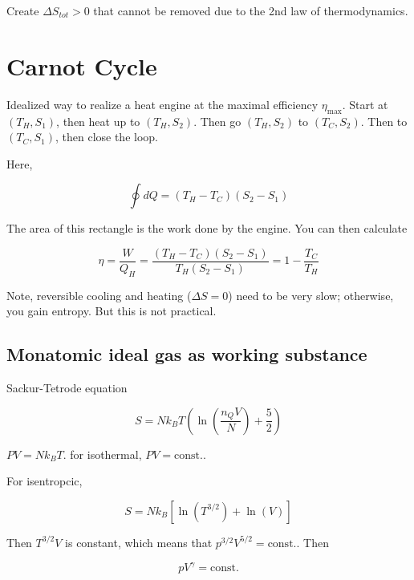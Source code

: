 \documentclass{article}
\newtheorem{one minute paper}[theorem]{One Minute Paper}
\begin{document}
Create $\Delta S_{tot}>0$ that cannot be removed due to the 2nd law of thermodynamics. 

\section*{Carnot Cycle}

Idealized way to realize a heat engine at the maximal efficiency $\eta_{\max}$. Start at $(T_H, S_1)$, then heat up to $(T_H, S_2)$. Then go $(T_H, S_2)$ to $(T_C, S_2)$. Then to $(T_C, S_1)$, then close the loop. 

Here, 

\begin{equation}
    \oint dQ = (T_H - T_C)(S_2 - S_1)
\end{equation}

The area of this rectangle is the work done by the engine. You can then calculate 

\begin{equation}
    \eta = \frac{W}{Q_H} = \frac{(T_H - T_C)(S_2 - S_1)}{T_H(S_2 - S_1)} = 1 - \frac{T_C}{T_H} 
\end{equation}

Note, reversible cooling and heating ($\Delta S =0$) need to be very slow; otherwise, you gain entropy. But this is not practical. 

\subsection*{Monatomic ideal gas as working substance}

Sackur-Tetrode equation 

\begin{equation}
    S = Nk_B T\left( \ln\left( \frac{n_Q V}{N} \right) + \frac{5}{2} \right)
\end{equation}

$PV = Nk_B T$. for isothermal, $PV = \text{const.}$. 

For isentropcic, 

\begin{equation}
    S = Nk_B \left[ \ln(T^{3/2}) + \ln(V) \right]
\end{equation}

Then $T^{3/2}V$ is constant, which means that $p^{3/2}V^{5/2} = \text{const.}$. Then 

\begin{equation}
    pV^{\gamma} = \text{const.}
\end{equation}
\end{document}
